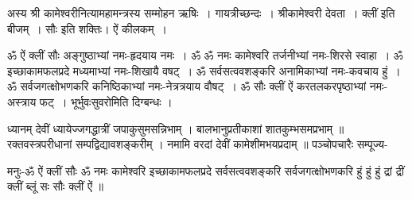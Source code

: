 अस्य श्री कामेश्वरीनित्यामहामन्त्रस्य सम्मोहन ऋषिः~। गायत्रीच्छन्दः~। श्रीकामेश्वरी देवता~। क्लीं इति बीजम्~। सौः इति शक्तिः। ऐं कीलकम्~।

ॐ ऐं क्लीं सौः अङ्गुष्ठाभ्यां नमः-हृदयाय नमः~। 
ॐ ॐ नमः कामेश्वरि तर्जनीभ्यां नमः-शिरसे स्वाहा~।
ॐ इच्छाकामफलप्रदे मध्यमाभ्यां नमः-शिखायै वषट्~।
ॐ सर्वसत्ववशङ्करि अनामिकाभ्यां नमः-कवचाय हुं~।
ॐ सर्वजगत्क्षोभणकरि कनिष्ठिकाभ्यां नमः-नेत्रत्रयाय वौषट्~।
ॐ सौः क्लीं ऐं करतलकरपृष्ठाभ्यां नमः-अस्त्राय फट्~।
भूर्भुवःसुवरोमिति दिग्बन्धः ।

ध्यानम्
देवीं ध्यायेज्जगद्धात्रीं जपाकुसुमसन्निभाम् ।
बालभानुप्रतीकाशां शातकुम्भसमप्रभाम् ॥
रक्तवस्त्रपरीधानां सम्पद्विद्यावशङ्करीम् ।
नमामि वरदां देवीं कामेशीमभयप्रदाम् ॥
पञ्चोपचारैः सम्पूज्य-

मनुः-ॐ ऐं क्लीं सौः ॐ नमः कामेश्वरि इच्छाकामफलप्रदे सर्वसत्ववशङ्करि सर्वजगत्क्षोभणकरि हुं हुं हुं द्रां द्रीं क्लीं ब्लूं सः सौः क्लीं ऐं ॥



